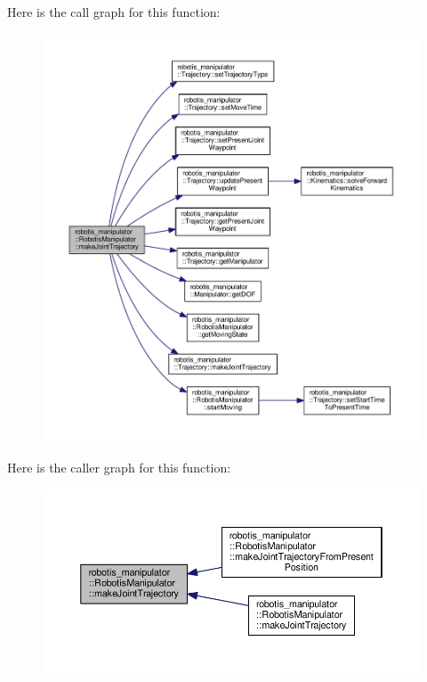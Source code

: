 Here is the call graph for this function\+:\nopagebreak
\begin{figure}[H]
\begin{center}
\leavevmode
\includegraphics[width=350pt]{classrobotis__manipulator_1_1_robotis_manipulator_a10670957d0b6522651b2494d0296cfd4_cgraph}
\end{center}
\end{figure}




Here is the caller graph for this function\+:\nopagebreak
\begin{figure}[H]
\begin{center}
\leavevmode
\includegraphics[width=350pt]{classrobotis__manipulator_1_1_robotis_manipulator_a10670957d0b6522651b2494d0296cfd4_icgraph}
\end{center}
\end{figure}


